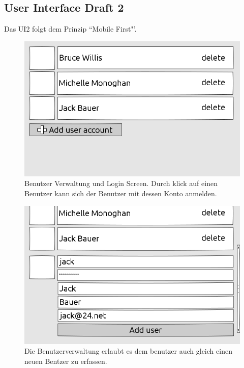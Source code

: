 \begin{landscape}
	
\chapter{User Interface Draft 2}
	Das UI2 folgt dem Prinzip ``Mobile First"'.
	\begin{figure}[H]
		\centering
		\includegraphics[height=0.6\textwidth]{../ui/img/uiDraft2/UserView-selectUser.png}
		\caption{Benutzer Verwaltung und Login Screen. Durch klick auf einen Benutzer kann sich der Benutzer mit dessen Konto anmelden.}
		\label{login screen}
	\end{figure}
	\begin{figure}[H]
		\centering
		\includegraphics[height=0.6\textwidth]{../ui/img/uiDraft2/UserView-addUser.png}
		\caption{Die Benutzerverwaltung erlaubt es dem benutzer auch gleich einen neuen Bentzer zu erfassen.}
		\label{user management screen}
	\end{figure}
		\begin{figure}[H]
		\centering

\end{figure}
\end{landscape}
